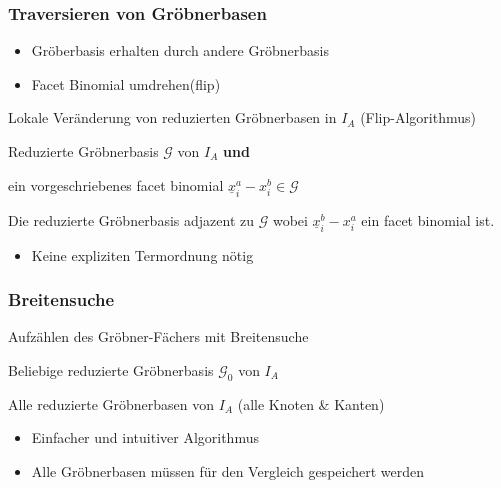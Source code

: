 \documentclass{beamer}
\newcommand{\Input}{\item[\algorithmicinput]}
\newcommand{\algorithmicinput}{\textbf{Input:}}
\newcommand{\Output}{\item[\algorithmicoutput]}
\newcommand{\algorithmicoutput}{\textbf{Output:}}
\begin{document}
\begin{frame}
\frametitle{Traversieren von Gröbnerbasen}
\begin{itemize}
\item Gröberbasis erhalten durch andere Gröbnerbasis
\item Facet Binomial \glqq umdrehen\grqq (flip)
\end{itemize}


\begin{algorithm}[H]
\caption{Lokale Veränderung von reduzierten Gröbnerbasen in $I_A$ (Flip-Algorithmus) }
\label{alg:flip}
\begin{algorithmic}[1]

\Input
Reduzierte Gröbnerbasis $ \mathcal{G} $ von $I_A$ \textbf{und}

ein vorgeschriebenes facet binomial    $ \underline{x}^{a}_{i} - x^{b}_{i} \in \mathcal{G} $  
\Output Die reduzierte Gröbnerbasis adjazent zu $\mathcal{G}$ wobei $ \underline{x}^{b}_{i} - x^{a}_{i} $ ein facet binomial ist.

\end{algorithmic}
\end{algorithm}

\begin{itemize}
\item Keine expliziten Termordnung nötig

\end{itemize}

	
\end{frame}


\begin{frame}[fragile]
\frametitle{Breitensuche}


\begin{algorithm}[H]
\caption{Aufzählen des Gröbner-Fächers mit Breitensuche}
\label{alg:breath}
\begin{algorithmic}[1]

\Input
Beliebige reduzierte Gröbnerbasis $ \mathcal{G}_0 $ von $I_A$
\Output
Alle reduzierte Gröbnerbasen von $I_A$ (alle Knoten \& Kanten)

\end{algorithmic}
\end{algorithm}

\begin{itemize}
\item Einfacher und intuitiver Algorithmus
\item Alle Gröbnerbasen müssen für den Vergleich gespeichert werden
\end{itemize}
 
\end{frame}
\end{document}
